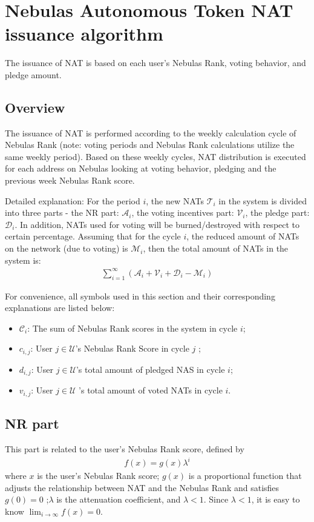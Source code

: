 \section{Nebulas Autonomous Token NAT issuance algorithm}

The issuance of NAT is based on each user's Nebulas Rank, voting behavior, and pledge amount.

\subsection{Overview}
The issuance of NAT is performed according to the weekly calculation cycle of Nebulas Rank (note: voting periods and Nebulas Rank calculations utilize the same weekly period). Based on these weekly cycles, NAT distribution is executed for each address on Nebulas looking at voting behavior, pledging and the previous week Nebulas Rank score.

Detailed explanation:
For the period $i$, the new NATs $\mathcal{T}_i$ in the system is divided into three parts - the NR part: $\mathcal{A}_i$, the voting incentives part: $\mathcal{V}_i$, the pledge part: $\mathcal{D}_i$.
In addition, NATs used for voting will be burned/destroyed with respect to certain percentage. Assuming that for the cycle $i$, the reduced amount of NATs on the network (due to voting) is $\mathcal{M}_i$, then the total amount of NATs in the system is:
\begin{align}
\sum_{i=1}^{\infty} (\mathcal{A}_i + \mathcal{V}_i + \mathcal{D}_i - \mathcal{M}_i)
\end{align}

For convenience, all symbols used in this section and their corresponding explanations are listed below:
\begin{itemize}
\item $\mathcal{C}_i$: The sum of Nebulas Rank scores in the system in  cycle $i$;
\item $c_{i,j}$: User $j \in \mathcal{U}$'s Nebulas Rank Score in cycle $j$ ;
\item $d_{i,j}$: User $j \in \mathcal{U}$'s total amount of pledged NAS in cycle $i$;
\item $v_{i,j}$: User $j \in \mathcal{U}$ 's total amount of voted NATs in cycle $i$.
\end{itemize}

\subsection{NR part}
This part is related to the user's Nebulas Rank score, defined by
\begin{align}
    f(x) = g(x)\lambda^i
\end{align}
\noindent where $x$ is the user's Nebulas Rank score; $g(x)$ is a proportional function that adjusts the relationship between NAT and the Nebulas Rank and satisfies $g(0) = 0$ ;$\lambda$ is the attenuation coefficient, and $\lambda < 1$.
Since $\lambda < 1$, it is easy to know $\lim_{i\to \infty}f(x) = 0$.

